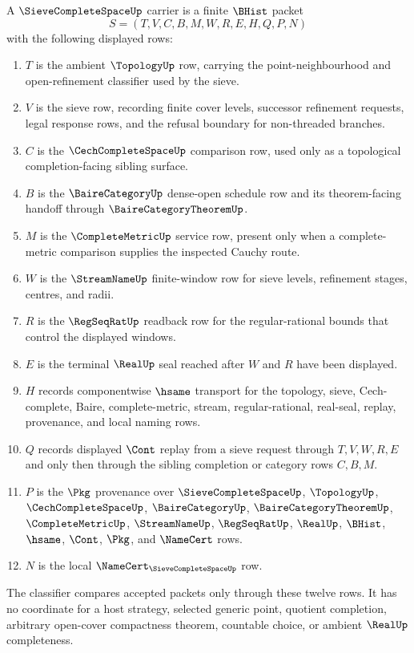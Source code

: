 \begin{definition}
\label{def:sieve-complete-space-carrier}
A $\SieveCompleteSpaceUp$ carrier is a finite $\BHist$ packet
$$
S=(T,V,C,B,M,W,R,E,H,Q,P,N)
$$
with the following displayed rows:
\begin{enumerate}
\item $T$ is the ambient $\TopologyUp$ row, carrying the point-neighbourhood and open-refinement classifier used by the sieve.
\item $V$ is the sieve row, recording finite cover levels, successor refinement requests, legal response rows, and the refusal boundary for non-threaded branches.
\item $C$ is the $\CechCompleteSpaceUp$ comparison row, used only as a topological completion-facing sibling surface.
\item $B$ is the $\BaireCategoryUp$ dense-open schedule row and its theorem-facing handoff through $\BaireCategoryTheoremUp$.
\item $M$ is the $\CompleteMetricUp$ service row, present only when a complete-metric comparison supplies the inspected Cauchy route.
\item $W$ is the $\StreamNameUp$ finite-window row for sieve levels, refinement stages, centres, and radii.
\item $R$ is the $\RegSeqRatUp$ readback row for the regular-rational bounds that control the displayed windows.
\item $E$ is the terminal $\RealUp$ seal reached after $W$ and $R$ have been displayed.
\item $H$ records componentwise $\hsame$ transport for the topology, sieve, Cech-complete, Baire, complete-metric, stream, regular-rational, real-seal, replay, provenance, and local naming rows.
\item $Q$ records displayed $\Cont$ replay from a sieve request through $T,V,W,R,E$ and only then through the sibling completion or category rows $C,B,M$.
\item $P$ is the $\Pkg$ provenance over $\SieveCompleteSpaceUp$, $\TopologyUp$, $\CechCompleteSpaceUp$, $\BaireCategoryUp$, $\BaireCategoryTheoremUp$, $\CompleteMetricUp$, $\StreamNameUp$, $\RegSeqRatUp$, $\RealUp$, $\BHist$, $\hsame$, $\Cont$, $\Pkg$, and $\NameCert$ rows.
\item $N$ is the local $\NameCert_{\SieveCompleteSpaceUp}$ row.
\end{enumerate}
The classifier compares accepted packets only through these twelve rows. It has no coordinate for a host strategy, selected generic point, quotient completion, arbitrary open-cover compactness theorem, countable choice, or ambient $\RealUp$ completeness.
\end{definition}

